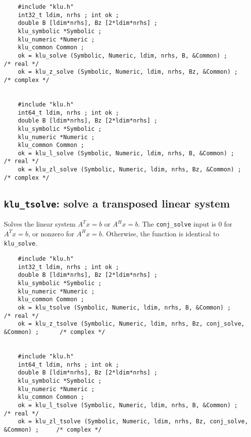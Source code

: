 \documentclass[11pt]{article}
\begin{document}
{\footnotesize
\begin{verbatim}
    #include "klu.h"
    int32_t ldim, nrhs ; int ok ;
    double B [ldim*nrhs], Bz [2*ldim*nrhs] ;
    klu_symbolic *Symbolic ;
    klu_numeric *Numeric ;
    klu_common Common ;
    ok = klu_solve (Symbolic, Numeric, ldim, nrhs, B, &Common) ;                      /* real */
    ok = klu_z_solve (Symbolic, Numeric, ldim, nrhs, Bz, &Common) ;                   /* complex */


    #include "klu.h"
    int64_t ldim, nrhs ; int ok ;
    double B [ldim*nrhs], Bz [2*ldim*nrhs] ;
    klu_symbolic *Symbolic ;
    klu_numeric *Numeric ;
    klu_common Common ;
    ok = klu_l_solve (Symbolic, Numeric, ldim, nrhs, B, &Common) ;                    /* real */
    ok = klu_zl_solve (Symbolic, Numeric, ldim, nrhs, Bz, &Common) ;                  /* complex */
\end{verbatim}
}

\subsection{{\tt klu\_tsolve}: solve a transposed linear system}

Solves the linear system $A^Tx=b$ or $A^Hx=b$.  The {\tt conj\_solve} input
is 0 for $A^Tx=b$, or nonzero for $A^Hx=b$.  Otherwise, the function is
identical to {\tt klu\_solve}.


{\footnotesize
\begin{verbatim}
    #include "klu.h"
    int32_t ldim, nrhs ; int ok ;
    double B [ldim*nrhs], Bz [2*ldim*nrhs] ;
    klu_symbolic *Symbolic ;
    klu_numeric *Numeric ;
    klu_common Common ;
    ok = klu_tsolve (Symbolic, Numeric, ldim, nrhs, B, &Common) ;                     /* real */
    ok = klu_z_tsolve (Symbolic, Numeric, ldim, nrhs, Bz, conj_solve, &Common) ;      /* complex */


    #include "klu.h"
    int64_t ldim, nrhs ; int ok ;
    double B [ldim*nrhs], Bz [2*ldim*nrhs] ;
    klu_symbolic *Symbolic ;
    klu_numeric *Numeric ;
    klu_common Common ;
    ok = klu_l_tsolve (Symbolic, Numeric, ldim, nrhs, B, &Common) ;                   /* real */
    ok = klu_zl_tsolve (Symbolic, Numeric, ldim, nrhs, Bz, conj_solve, &Common) ;     /* complex */
\end{verbatim}
}


\end{document}
